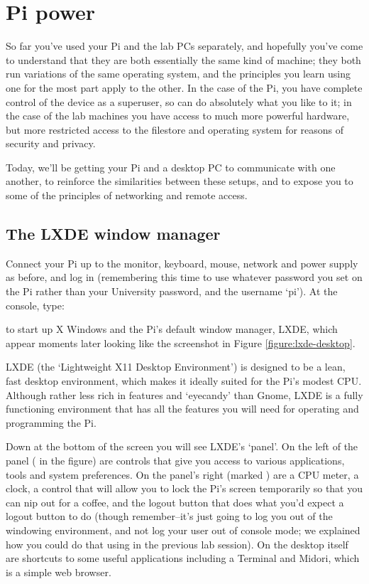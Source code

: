 \chapter{Pi power}
\minitoc
{}

So far you've used your Pi and the lab PCs separately, and hopefully you've come to understand that they are both essentially the same kind of machine; they both run variations of the same operating system, and the principles you learn using one for the most part apply to the other. In the case of the Pi, you have complete control of the device as a superuser, so can do absolutely what you like to it; in the case of the lab machines you have access to much more powerful hardware, but more restricted access to the filestore and operating system for reasons of security and privacy. 

Today, we'll be getting your Pi and a desktop PC to communicate with one another, to reinforce the similarities between these setups, and to expose you to some of the principles of networking and remote access. 

\section{The LXDE window manager}

Connect your Pi up to the monitor, keyboard, mouse, network and power supply as before, and log in (remembering this time to use whatever password you set on the Pi rather than your University password, and the username `pi'). At the console, type:


to start up X Windows and the Pi's default window manager, LXDE, which appear moments later looking like the screenshot in Figure \ref{figure:lxde-desktop}. 

LXDE (the `Lightweight X11 Desktop Environment') is designed to be a lean, fast desktop environment, which makes it ideally suited for the Pi's modest CPU. Although rather less rich in features and `eyecandy' than Gnome, LXDE is a fully functioning environment that has all the features you will need for operating and programming the Pi. 

Down at the bottom of the screen you will see LXDE's `panel'. On the left of the panel (\protect{} in the figure) are controls that give you access to various applications, tools and system preferences. On the panel's right (marked \protect{}) are a CPU meter, a clock, a control that will allow you to lock the Pi's screen temporarily so that you can nip out for a coffee, and the logout button that does what you'd expect a logout button to do (though remember--it's just going to log you out of the windowing environment, and not log your user out of console mode; we explained how you could do that using  in the previous lab session). On the desktop itself are shortcuts to some useful applications including a Terminal and Midori, which is a simple web browser. 


